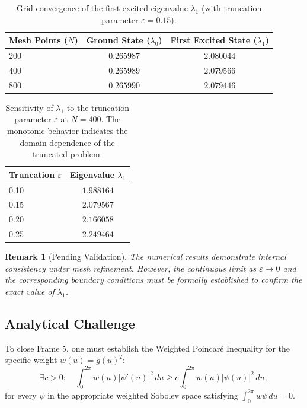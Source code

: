 \documentclass[12pt,a4paper]{article}
\newtheorem{remark}{Remark}
\begin{document}
\begin{table}[h!]
\centering
\caption{Grid convergence of the first excited eigenvalue \(\lambda_1\) (with truncation parameter \(\varepsilon = 0.15\)).}
\begin{tabular}{lcc}
\toprule
Mesh Points (\(N\)) & Ground State (\(\lambda_0\)) & First Excited State (\(\lambda_1\)) \\
\midrule
200 & \(0.265987\) & \(2.080044\) \\
400 & \(0.265989\) & \(2.079566\) \\
800 & \(0.265990\) & \(2.079446\) \\
\bottomrule
\end{tabular}
\end{table}

\begin{table}[h!]
\centering
\caption{Sensitivity of \(\lambda_1\) to the truncation parameter \(\varepsilon\) at \(N=400\). The monotonic behavior indicates the domain dependence of the truncated problem.}
\begin{tabular}{lc}
\toprule
Truncation \(\varepsilon\) & Eigenvalue \(\lambda_1\) \\
\midrule
0.10 & \(1.988164\) \\
0.15 & \(2.079567\) \\
0.20 & \(2.166058\) \\
0.25 & \(2.249464\) \\
\bottomrule
\end{tabular}
\end{table}

\begin{remark}[Pending Validation]
The numerical results demonstrate internal consistency under mesh refinement. However, the continuous limit as \(\varepsilon \to 0\) and the corresponding boundary conditions must be formally established to confirm the exact value of \(\lambda_1\).
\end{remark}

\subsection{Analytical Challenge}\label{subsec:5.5}

To close Frame 5, one must establish the Weighted Poincaré Inequality for the specific weight \(w(u) = g(u)^2\):
\begin{equation}\label{eq:poincare_challenge}
\exists c > 0 : \quad \int_0^{2\pi} w(u) |\psi'(u)|^2 \, du \ge c \int_0^{2\pi} w(u) |\psi(u)|^2 \, du,
\end{equation}
for every \(\psi\) in the appropriate weighted Sobolev space satisfying \(\int_0^{2\pi} w\psi \, du = 0\).
\end{document}

